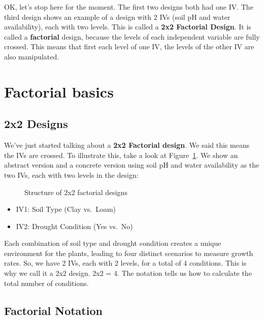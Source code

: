 \documentclass[
  letterpaper,
  DIV=11,
  numbers=noendperiod]{scrreprt}
\providecommand{\tightlist}{%
  \setlength{\itemsep}{0pt}\setlength{\parskip}{0pt}}\usepackage{longtable,booktabs,array}
\begin{document}
OK, let's stop here for the moment. The first two designs both had one
IV. The third design shows an example of a design with 2 IVs (soil pH
and water availability), each with two levels. This is called a
\textbf{2x2 Factorial Design}. It is called a \textbf{factorial} design,
because the levels of each independent variable are fully crossed. This
means that first each level of one IV, the levels of the other IV are
also manipulated.

\section{Factorial basics}\label{factorial-basics}

\subsection{2x2 Designs}\label{x2-designs}

We've just started talking about a \textbf{2x2 Factorial design}. We
said this means the IVs are crossed. To illustrate this, take a look at
Figure~\ref{fig-10designs}. We show an abstract version and a concrete
version using soil pH and water availability as the two IVs, each with
two levels in the design:

\begin{figure}


\caption{\label{fig-10designs}Structure of 2x2 factorial designs}

\end{figure}%

\begin{itemize}
\tightlist
\item
  IV1: Soil Type (Clay vs.~Loam)
\item
  IV2: Drought Condition (Yes vs.~No)
\end{itemize}

Each combination of soil type and drought condition creates a unique
environment for the plants, leading to four distinct scenarios to
measure growth rates. So, we have 2 IVs, each with 2 levels, for a total
of 4 conditions. This is why we call it a 2x2 design. 2x2 = 4. The
notation tells us how to calculate the total number of conditions.

\subsection{Factorial Notation}\label{factorial-notation}
\end{document}
